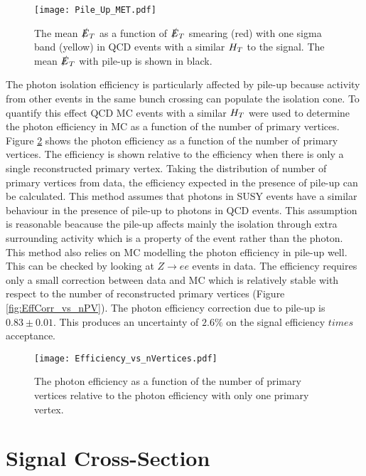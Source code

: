 \begin{figure}
\begin{center}
\texttt{[image: Pile\_Up\_MET.pdf]}
\end{center}
\caption{The mean $\slashed{E}_{T}$ as a function of $\slashed{E}_{T}$ smearing (red) with one sigma
band (yellow) in QCD events with a similar $H_{T}$ to the signal. The mean $\slashed{E}_{T}$ 
with pile-up is shown in black.}
\label{fig:Pile_Up_MET}
\end{figure}

The photon isolation efficiency is particularly affected by pile-up because
activity from other events in the same bunch crossing can populate the isolation
cone. To quantify this effect QCD MC events with a similar $H_{T}$ were used to
determine the photon efficiency in MC as a function of the number of primary
vertices. Figure \ref{fig:Efficiency_vs_nVertices} shows the photon efficiency
as a function of the number of primary vertices. The efficiency is shown
relative to the efficiency when there is only a single reconstructed primary
vertex. Taking the distribution of number of primary vertices from data, the 
efficiency expected in the presence of pile-up can be calculated. This method 
assumes that photons in SUSY events have a similar behaviour in the presence of 
pile-up to photons in QCD events. This assumption is reasonable beacause the 
pile-up affects mainly the isolation through extra surrounding activity which is 
a property of the event rather than the photon. This method also relies on MC 
modelling the photon efficiency in pile-up well. This can be checked by looking 
at $Z\rightarrow ee$ events in data. The efficiency requires only a small 
correction between data and MC which is relatively stable with respect to the
number of reconstructed primary vertices (Figure \ref{fig:EffCorr_vs_nPV}). The 
photon efficiency correction due to pile-up is $0.83\pm0.01$. This produces an 
uncertainty of $2.6\unit{\%}$ on the signal efficiency $times$ acceptance.

\begin{figure}
\begin{center}
\texttt{[image: Efficiency\_vs\_nVertices.pdf]}
\end{center}
\caption{The photon efficiency as a function of the number of primary 
vertices relative to the photon efficiency with only one primary vertex.}
\label{fig:Efficiency_vs_nVertices}
\end{figure}

\section{Signal Cross-Section}
\label{sec:xsec}

